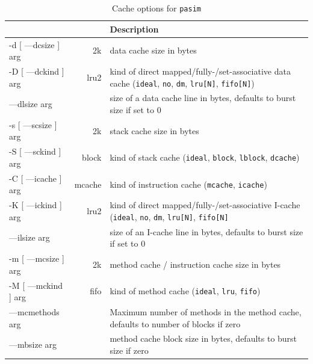 \documentclass[a4paper,fontsize=10pt,twoside,DIV15,BCOR12mm,headinclude=true,footinclude=false,pagesize,bibtotoc]{scrbook}
\begin{document}
\begin{table}
  \centering
  \caption{Cache options for \texttt{pasim}}
  \label{tab:pasimopts_cache}
  \begin{tabular}{>{\ttfamily}l<{}>{\ttfamily}r<{}p{}}
    \toprule
    \multicolumn{1}{l}{Option} & \multicolumn{1}{l}{Default} & Description \\
    \midrule
    -d [ ---dcsize ] arg & 2k     & data cache size in bytes \\
    -D [ ---dckind ] arg & lru2   & kind of direct mapped/fully-/set-associative data cache (\texttt{ideal}, \texttt{no}, \texttt{dm}, \texttt{lru[N]}, \texttt{fifo[N]}) \\
    ---dlsize arg        & 0      & size of a data cache line in bytes, defaults to burst size if set to 0 \\
    -s [ ---scsize ] arg & 2k     & stack cache size in bytes \\
    -S [ ---sckind ] arg & block  & kind of stack cache (\texttt{ideal}, \texttt{block}, \texttt{lblock}, \texttt{dcache}) \\
    -C [ ---icache ] arg & mcache & kind of instruction cache (\texttt{mcache}, \texttt{icache}) \\
    -K [ ---ickind ] arg & lru2   & kind of direct mapped/fully-/set-associative I-cache (\texttt{ideal}, \texttt{no}, \texttt{dm}, \texttt{lru[N]}, \texttt{fifo[N]} \\
    ---ilsize arg        & 0      & size of an I-cache line in bytes, defaults to burst size if set to 0 \\
    -m [ ---mcsize ] arg & 2k     & method cache / instruction cache size in bytes \\
    -M [ ---mckind ] arg & fifo   & kind of method cache (\texttt{ideal}, \texttt{lru}, \texttt{fifo}) \\
    ---mcmethods arg     & 16     & Maximum number of methods in the method cache, defaults to number of blocks if zero \\
    ---mbsize arg        & 8      & method cache block size in bytes, defaults to burst size if zero \\
    \bottomrule
  \end{tabular}
\end{table}
\end{document}
